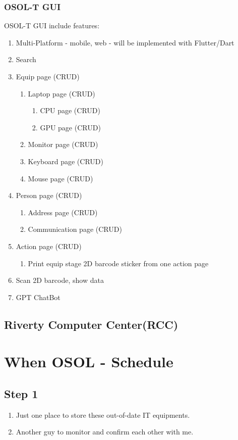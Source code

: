 \documentclass[a4paper,11pt]{article}
\begin{document}
\subsubsection{OSOL-T GUI}
OSOL-T GUI include features:
\begin{enumerate}
	\item Multi-Platform - mobile, web - will be implemented with Flutter/Dart
	\item Search
	\item Equip page (CRUD)
	\begin{enumerate}
		\item Laptop page (CRUD)
		\begin{enumerate}
			\item CPU page (CRUD)
			\item GPU page (CRUD)
		\end{enumerate}
		\item Monitor page (CRUD)
		\item Keyboard page (CRUD)
		\item Mouse page (CRUD)
	\end{enumerate}
	\item Person page (CRUD)
	\begin{enumerate}
		\item Address page (CRUD)
		\item Communication page (CRUD) 
	\end{enumerate}
	\item Action page (CRUD)
	\begin{enumerate}
		\item Print equip stage 2D barcode sticker from one action page
	\end{enumerate}
	\item Scan 2D barcode, show data
	\item GPT ChatBot
\end{enumerate}



\subsection{Riverty Computer Center(RCC)}


\section{When OSOL - Schedule}
\subsection{Step 1}
\begin{enumerate}
\item Just one place to store these out-of-date IT equipments.
\item Another guy to monitor and confirm each other with me.
\end{enumerate}
\end{document}
